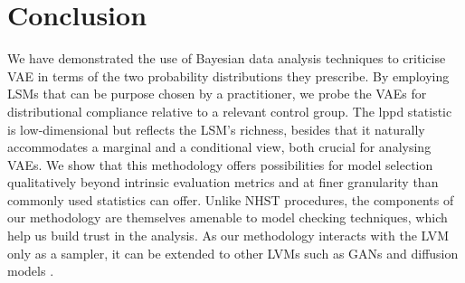 \section{Conclusion}\label{sec:discussion}

We have demonstrated the use of Bayesian data analysis techniques to criticise VAE in terms of the two probability distributions they prescribe. By employing LSMs that can be purpose chosen by a practitioner, we probe the VAEs for distributional  compliance relative to a relevant control group. The lppd statistic is low-dimensional but reflects the LSM's richness, besides that it naturally accommodates a marginal and a conditional view, both crucial for analysing VAEs. We show that this methodology offers possibilities for model selection qualitatively beyond intrinsic evaluation metrics and at finer granularity than commonly used statistics can offer. Unlike NHST procedures, the components of our methodology are themselves amenable to model checking techniques, which help us build trust in the analysis.
As our methodology interacts with the LVM only as a sampler, it can be extended to other LVMs such as GANs \citep{goodfellow2014generative} and diffusion models \citep{sohl2015deep,kingma2021variational}.


